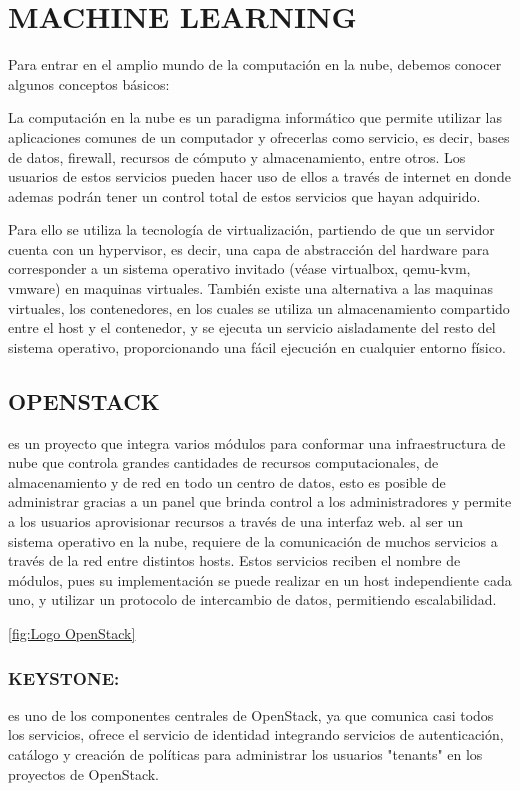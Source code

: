     
    \section{MACHINE LEARNING}
    Para entrar en el amplio mundo de la computación en la nube, debemos conocer algunos conceptos básicos:
    
   La computación en la nube es un paradigma informático que permite utilizar las aplicaciones comunes de un computador y ofrecerlas como servicio, es decir, bases de datos, firewall, recursos de cómputo y almacenamiento, entre otros. Los usuarios de estos servicios pueden hacer uso de ellos a través de internet en donde ademas podrán tener un control total de estos servicios que hayan adquirido.
    
    Para ello se utiliza la tecnología de virtualización, partiendo de que un servidor cuenta con un hypervisor, es decir, una capa de abstracción del hardware para corresponder a un sistema operativo invitado (véase virtualbox, qemu-kvm, vmware) en maquinas virtuales. También existe una alternativa  a las maquinas virtuales, los contenedores, en los cuales se utiliza un almacenamiento compartido entre el host y el contenedor, y se ejecuta un servicio aisladamente del resto del sistema operativo, proporcionando una fácil ejecución en cualquier entorno físico.
    
    \subsection{OPENSTACK}
    es un proyecto que integra varios módulos para conformar una infraestructura de nube que controla grandes cantidades de recursos computacionales, de almacenamiento y de red en todo un centro de datos, esto es posible de administrar  gracias a un panel que brinda control a los administradores y permite a los usuarios aprovisionar recursos a través de una interfaz web. al ser un sistema operativo en la nube, requiere de la comunicación de muchos servicios a través de la red entre distintos hosts. Estos servicios reciben el nombre de módulos, pues su implementación se puede realizar en un host independiente cada uno, y utilizar un protocolo de intercambio de datos, permitiendo escalabilidad.
    
  \ref{fig:Logo OpenStack}
  \label{openstackIMG}
  
    
  
    \subsubsection{KEYSTONE:}
    es uno de los componentes centrales de OpenStack, ya que comunica casi todos los servicios, ofrece el servicio de identidad integrando servicios de autenticación, catálogo y creación de políticas para administrar los usuarios "tenants" en los proyectos de OpenStack.
    
